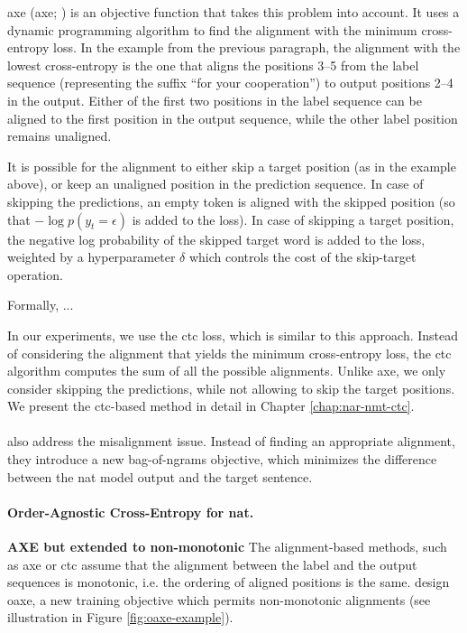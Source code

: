 \Acl{axe}  (\acs{axe}; \citealp{ghazvininejad2020aligned}) is an
objective function that takes this problem into account. It uses a dynamic
programming algorithm to find the alignment with the minimum cross-entropy
loss. In the example from the previous paragraph, the alignment with the lowest
cross-entropy is the one that aligns the positions 3--5 from the label sequence
(representing the suffix ``for your cooperation'') to output positions 2--4 in
the output. Either of the first two positions in the label sequence can be
aligned to the first position in the output sequence, while the other label
position remains unaligned.

It is possible for the alignment to either skip a target position (as in the
example above), or keep an unaligned position in the prediction sequence. In
case of skipping the predictions, an empty token is aligned with the skipped
position (so that $-\log p(y_t = \epsilon)$ is added to the loss). In case of
skipping a target position, the negative log probability of the skipped target
word is added to the loss, weighted by a hyperparameter $\delta$ which controls
the cost of the skip-target operation.

Formally, ... 

In our experiments, we use the \ac{ctc} loss, which is similar to this
approach. Instead of considering the alignment that yields the minimum
cross-entropy loss, the \ac{ctc} algorithm computes the sum of all the possible
alignments. Unlike \ac{axe}, we only consider skipping the predictions, while
not allowing to skip the target positions. We present the \ac{ctc}-based method
in detail in Chapter \ref{chap:nar-nmt-ctc}.


\paragraph{} \citet{shao2020minimizing} also address the
misalignment issue. Instead of finding an appropriate alignment, they introduce
a new bag-of-ngrams objective, which minimizes the difference between the
\ac{nat} model output and the target sentence. 

\paragraph{Order-Agnostic Cross-Entropy for \acs{nat}.} \textbf{AXE but
  extended to non-monotonic} The alignment-based methods, such as \ac{axe} or
\ac{ctc} assume that the alignment between the label and the output sequences
is monotonic, i.e. the ordering of aligned positions is the
same. \citet{du2021orderagnostic} design \ac{oaxe}, a new training objective
which permits non-monotonic alignments (see illustration in Figure
\ref{fig:oaxe-example}).  

